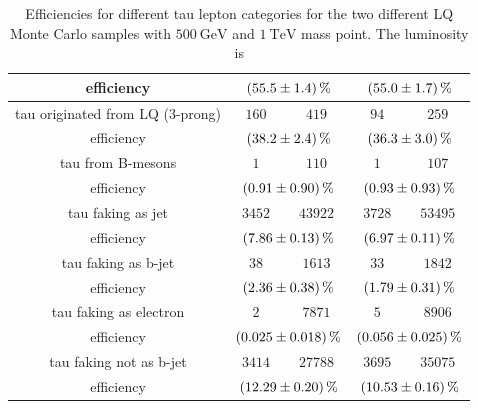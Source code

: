 \begin{table}
\begin{tabular*}{\linewidth}{@{\extracolsep{\fill}}ccccc}
		efficiency                  & \multicolumn{2}{c}{$\SI{55.5\pm 1.4}{\percent}$}   & \multicolumn{2}{c}{$\SI{55.0\pm 1.7}{\percent}$}
		\\
		\hline
                tau originated from LQ (3-prong)& $160$        & $419$         & $94$          & $259$
		\\
		efficiency                  & \multicolumn{2}{c}{$\SI{38.2\pm 2.4}{\percent}$}   & \multicolumn{2}{c}{$\SI{36.3\pm 3.0}{\percent}$}
		\\
		\hline
		tau from B-mesons           & $1$            & $110$      & $1$            & $107$ 
		\\
		efficiency                  & \multicolumn{2}{c}{$\SI{0.91\pm 0.90}{\percent}$}   & \multicolumn{2}{c}{$\SI{0.93\pm 0.93}{\percent}$}
		\\
		\hline
		tau faking as jet            & $3452$         & $43922$      & $3728$         & $53495$ 
		\\
		efficiency                  & \multicolumn{2}{c}{$\SI{7.86\pm 0.13}{\percent}$}   & \multicolumn{2}{c}{$\SI{6.97\pm 0.11}{\percent}$}
		\\
		\hline
		tau faking as b-jet          & $38$        & $1613$      & $33$         & $1842$ 
		\\
		efficiency                  & \multicolumn{2}{c}{$\SI{2.36\pm 0.38}{\percent}$}   & \multicolumn{2}{c}{$\SI{1.79\pm 0.31}{\percent}$}
		\\
		\hline
                tau faking as electron          & $2$        & $7871$      & $5$         & $8906$ 
		\\
		efficiency                  & \multicolumn{2}{c}{$\SI{0.025\pm 0.018}{\percent}$}   & \multicolumn{2}{c}{$\SI{0.056\pm 0.025}{\percent}$}
		\\
		\hline
                tau faking not as b-jet          & $3414$        & $27788$      & $3695$         & $35075$ 
		\\
		efficiency                  & \multicolumn{2}{c}{$\SI{12.29\pm 0.20}{\percent}$}   & \multicolumn{2}{c}{$\SI{10.53\pm 0.16}{\percent}$}
		\\
		\hline
		\hline
		\end{tabular*}
		\caption[Efficiencies for the two LQ samples with $\SI{500}{\giga\electronvolt}$ and $\SI{1}{\tera\electronvolt}$ mass point.]{Efficiencies for different tau lepton categories for the two different LQ Monte Carlo samples with $\SI{500}{\giga\electronvolt}$ and $\SI{1}{\tera\electronvolt}$ mass point. The luminosity is}
		\label{LQEffTable}
                \renewcommand{\arraystretch}{1}
                \end{table}
%
